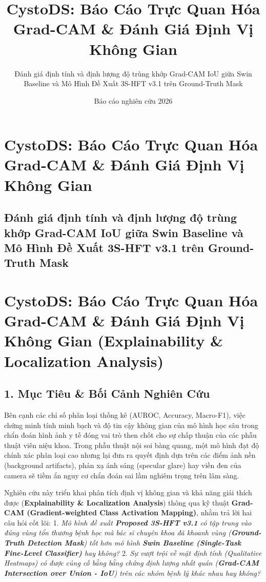 \documentclass[
  11pt,
  a4paper,
]{article}
\title{CystoDS: Báo Cáo Trực Quan Hóa Grad-CAM \& Đánh Giá Định Vị Không
Gian}
\subtitle{Đánh giá định tính và định lượng độ trùng khớp Grad-CAM IoU
giữa Swin Baseline và Mô Hình Đề Xuất 3S-HFT v3.1 trên Ground-Truth
Mask}
\author{}
\date{Báo cáo nghiên cứu 2026}
\begin{document}
\maketitle

\section{CystoDS: Báo Cáo Trực Quan Hóa Grad-CAM \& Đánh Giá Định Vị
Không
Gian}\label{cystods-buxe1o-cuxe1o-trux1ef1c-quan-huxf3a-grad-cam-ux111uxe1nh-giuxe1-ux111ux1ecbnh-vux1ecb-khuxf4ng-gian}

\subsection{Đánh giá định tính và định lượng độ trùng khớp Grad-CAM IoU
giữa Swin Baseline và Mô Hình Đề Xuất 3S-HFT v3.1 trên Ground-Truth
Mask}\label{ux111uxe1nh-giuxe1-ux111ux1ecbnh-tuxednh-vuxe0-ux111ux1ecbnh-lux1b0ux1ee3ng-ux111ux1ed9-truxf9ng-khux1edbp-grad-cam-iou-giux1eefa-swin-baseline-vuxe0-muxf4-huxecnh-ux111ux1ec1-xuux1ea5t-3s-hft-v3.1-truxean-ground-truth-mask}

\section{CystoDS: Báo Cáo Trực Quan Hóa Grad-CAM \& Đánh Giá Định Vị
Không Gian (Explainability \& Localization
Analysis)}\label{cystods-buxe1o-cuxe1o-trux1ef1c-quan-huxf3a-grad-cam-ux111uxe1nh-giuxe1-ux111ux1ecbnh-vux1ecb-khuxf4ng-gian-explainability-localization-analysis}

\subsection{1. Mục Tiêu \& Bối Cảnh Nghiên
Cứu}\label{mux1ee5c-tiuxeau-bux1ed1i-cux1ea3nh-nghiuxean-cux1ee9u}

Bên cạnh các chỉ số phân loại thống kê (AUROC, Accuracy, Macro-F1), việc
chứng minh tính minh bạch và độ tin cậy không gian của mô hình học sâu
trong chẩn đoán hình ảnh y tế đóng vai trò then chốt cho sự chấp thuận
của các phẫu thuật viên niệu khoa. Trong phẫu thuật nội soi bàng quang,
một mô hình đạt độ chính xác phân loại cao nhưng lại đưa ra quyết định
dựa trên các điểm ảnh nền (background artifacts), phản xạ ánh sáng
(specular glare) hay viền đen của camera sẽ tiềm ẩn nguy cơ chẩn đoán
sai lầm nghiêm trọng trên lâm sàng.

Nghiên cứu này triển khai phân tích định vị không gian và khả năng giải
thích được (\textbf{Explainability \& Localization Analysis}) thông qua
kỹ thuật \textbf{Grad-CAM (Gradient-weighted Class Activation Mapping)},
nhằm trả lời hai câu hỏi cốt lõi: 1. \emph{Mô hình đề xuất
\textbf{Proposed 3S-HFT v3.1} có tập trung vào đúng vùng tổn thương bệnh
học mà bác sĩ chuyên khoa đã khoanh vùng (\textbf{Ground-Truth Detection
Mask}) tốt hơn mô hình \textbf{Swin Baseline (Single-Task Fine-Level
Classifier)} hay không?} 2. \emph{Sự vượt trội về mặt định tính
(Qualitative Heatmaps) có được củng cố bằng bằng chứng định lượng nhất
quán (\textbf{Grad-CAM Intersection over Union - IoU}) trên các nhóm
bệnh lý khác nhau hay không?}
\end{document}
